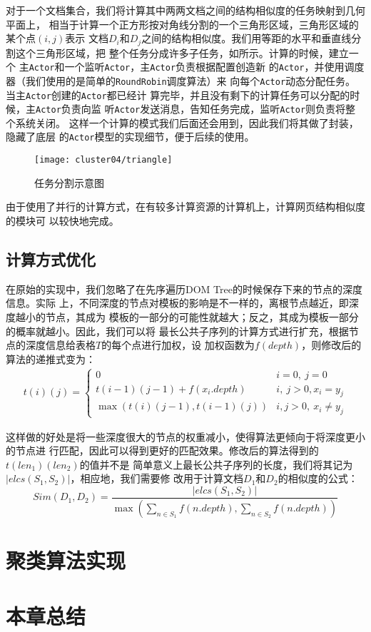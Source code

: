对于一个文档集合，我们将计算其中两两文档之间的结构相似度的任务映射到几何平面上，
相当于计算一个正方形按对角线分割的一个三角形区域，三角形区域的某个点$(i, j)$表示
文档$D_i$和$D_j$之间的结构相似度。我们用等距的水平和垂直线分割这个三角形区域，把
整个任务分成许多子任务，如所示。计算的时候，建立一个
主\texttt{Actor}和一个监听\texttt{Actor}，主\texttt{Actor}负责根据配置创造新
的\texttt{Actor}，并使用调度器（我们使用的是简单的\texttt{RoundRobin}调度算法）来
向每个\texttt{Actor}动态分配任务。当主\texttt{Actor}创建的\texttt{Actor}都已经计
算完毕，并且没有剩下的计算任务可以分配的时候，主\texttt{Actor}负责向监
听\texttt{Actor}发送消息，告知任务完成，监听\texttt{Actor}则负责将整个系统关闭。
这样一个计算的模式我们后面还会用到，因此我们将其做了封装，隐藏了底层
的\texttt{Actor}模型的实现细节，便于后续的使用。
\begin{figure}
  \centering
  \texttt{[image: cluster04/triangle]}
  \caption{任务分割示意图}
  \label{cluster:fig:triangle}
\end{figure}

由于使用了并行的计算方式，在有较多计算资源的计算机上，计算网页结构相似度的模块可
以较快地完成。

\subsection{计算方式优化}
在原始的实现中，我们忽略了在先序遍历DOM Tree的时候保存下来的节点的深度信息。实际
上，不同深度的节点对模板的影响是不一样的，离根节点越近，即深度越小的节点，其成为
模板的一部分的可能性就越大；反之，其成为模板一部分的概率就越小。因此，我们可以将
最长公共子序列的计算方式进行扩充，根据节点的深度信息给表格$T$的每个点进行加权，设
加权函数为$f(depth)$，则修改后的算法的递推式变为：
\begin{eqnarray}
  t(i)(j) =
  \begin{cases}
    0 & i = 0,\: j = 0\\
    t(i-1)(j-1) + f(x_i.depth) & i,\: j > 0, x_i=y_j\\
    \max(t(i)(j-1), t(i-1)(j)) & i, j > 0,\: x_i \ne y_j
  \end{cases}
\end{eqnarray}

这样做的好处是将一些深度很大的节点的权重减小，使得算法更倾向于将深度更小的节点进
行匹配，因此可以得到更好的匹配效果。修改后的算法得到的$t(len_1)(len_2)$的值并不是
简单意义上最长公共子序列的长度，我们将其记为$|elcs(S_1,S_2)|$，相应地，我们需要修
改用于计算文档$D_1$和$D_2$的相似度的公式：
\[
Sim(D_1,D_2)=\frac{|elcs(S_1,S_2)|}{\max(\sum\limits_{n\in
    S_1}{f(n.depth)},\sum\limits_{n\in S_2}{f(n.depth)})}
\]
\section{聚类算法实现}
\label{sec:clusteralgo}

\section{本章总结}
\label{sec:summarycluster}


